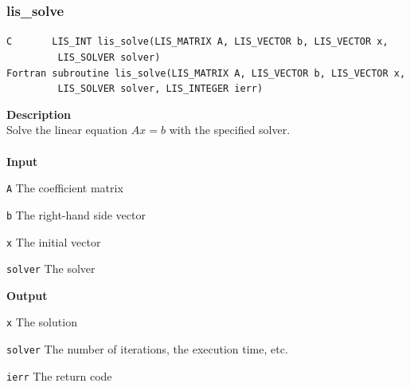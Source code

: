 \documentclass[a4paper]{article}
\newcommand{\namelistlabel}[1]{\mbox{#1}\hfill}
\newenvironment{namelist}[1]{%
\begin{list}{}
  {\let\makelabel\namelistlabel
  \settowidth{\labelwidth}{#1}
  \setlength{\leftmargin}{1.1\labelwidth}}
  }{%
\end{list}}
\begin{document}
\subsubsection{lis\_solve}
\begin{screen}
\verb|C       LIS_INT lis_solve(LIS_MATRIX A, LIS_VECTOR b, LIS_VECTOR x,|\\
\verb|         LIS_SOLVER solver)|\\
\verb|Fortran subroutine lis_solve(LIS_MATRIX A, LIS_VECTOR b, LIS_VECTOR x,|\\
\verb|         LIS_SOLVER solver, LIS_INTEGER ierr)|
\end{screen}
{\bf Description}\\
\indent
Solve the linear equation $Ax = b$ with the specified solver.
\\ \\
\noindent
{\bf Input}
\begin{namelist}{XXXXXXXXXXXXXXXXXXXX}
\item[\tt A] The coefficient matrix
\item[\tt b] The right-hand side vector
\item[\tt x] The initial vector
\item[\tt solver] The solver
\end{namelist}
{\bf Output}
\begin{namelist}{XXXXXXXXXXXXXXXXXXXX}
\item[\tt x] The solution
\item[\tt solver] The number of iterations, the execution time, etc.
\item[\tt ierr] The return code
\end{namelist}

\newpage
\end{document}
